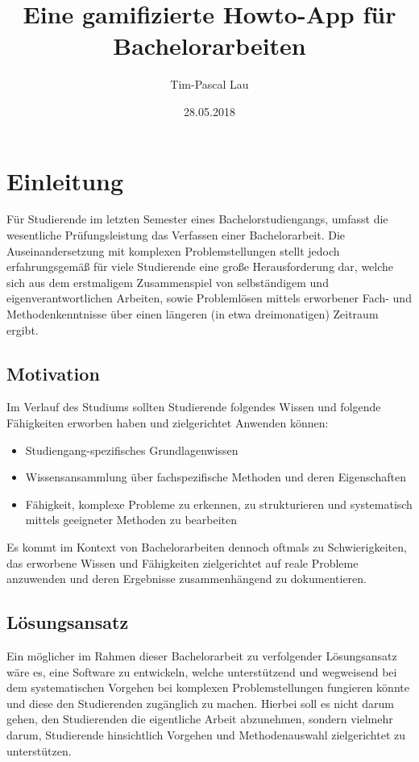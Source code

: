 \documentclass{scrreprt}
\title{Eine gamifizierte Howto-App für Bachelorarbeiten}
\author{Tim-Pascal Lau}
\date{28.05.2018}
\begin{document}
\maketitle
\tableofcontents


\chapter{Einleitung}
Für Studierende im letzten Semester eines Bachelorstudiengangs, umfasst die wesentliche Prüfungsleistung das Verfassen einer Bachelorarbeit.
Die Auseinandersetzung mit komplexen Problemstellungen stellt jedoch erfahrungsgemäß für viele Studierende eine große Herausforderung dar, welche sich aus dem erstmaligem Zusammenspiel von selbständigem und eigenverantwortlichen Arbeiten, sowie Problemlösen mittels erworbener Fach- und Methodenkenntnisse über einen längeren (in etwa dreimonatigen) Zeitraum ergibt.

\section{Motivation}
Im Verlauf des Studiums sollten Studierende folgendes Wissen und folgende Fähigkeiten erworben haben und zielgerichtet Anwenden können:
\begin{itemize}
\item Studiengang-spezifisches Grundlagenwissen
\item Wissensansammlung über fachspezifische Methoden und deren Eigenschaften
\item Fähigkeit, komplexe Probleme zu erkennen, zu strukturieren und systematisch mittels geeigneter Methoden zu bearbeiten
\end{itemize}
Es kommt im Kontext von Bachelorarbeiten dennoch oftmals zu Schwierigkeiten, das erworbene Wissen und Fähigkeiten zielgerichtet auf reale Probleme anzuwenden und deren Ergebnisse zusammenhängend zu dokumentieren.

\section{Lösungsansatz}
Ein möglicher im Rahmen dieser Bachelorarbeit zu verfolgender Lösungsansatz wäre es, eine Software zu entwickeln, welche unterstützend und wegweisend bei dem systematischen Vorgehen bei komplexen Problemstellungen fungieren könnte und diese den Studierenden zugänglich zu machen.
Hierbei soll es nicht darum gehen, den Studierenden die eigentliche Arbeit abzunehmen, sondern vielmehr darum, Studierende hinsichtlich Vorgehen und Methodenauswahl zielgerichtet zu unterstützen.
\end{document}
